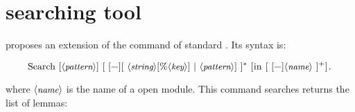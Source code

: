 \section{\ssr{} searching tool}

\ssr{} proposes an extension of the  command of standard
\Coq{}. Its syntax is:


$$\C{Search}\ [\N{pattern}]\ [\ [\C{\-}][\ \N{string}[\C{\%}\N{key}]\
|\ \N{pattern}]\ ]^*\
[\C{in}\ [\ [\C{\-}]\N{name}\ ]^+]\C{.}$$


where $\langle\mbox{\itshape\rmfamily\small name}\rangle$ is the name of a open module.
This command searches returns the list of lemmas:

